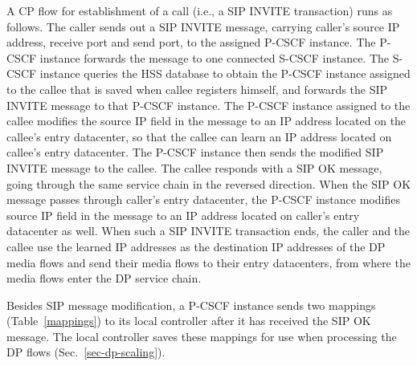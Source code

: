

A CP flow for establishment of a call (i.e., a SIP INVITE transaction) runs as follows.
The caller sends out a SIP INVITE message, carrying caller's source IP address, receive port and send port, to the assigned P-CSCF instance.
The P-CSCF instance forwards the message to one connected S-CSCF instance.  The
S-CSCF instance queries the HSS database to obtain the P-CSCF instance assigned
to the callee that is saved when callee registers himself, and forwards the SIP
INVITE message to that P-CSCF instance. The P-CSCF instance assigned to the
callee modifies the source IP field in the message to an IP address located on
the callee's entry datacenter, so that the callee can learn an IP address
located on callee's entry datacenter. The P-CSCF instance then sends the
modified SIP INVITE message to the callee.  The callee responds with a SIP OK
message, going through the same service chain in the reversed direction. When
the SIP OK message passes through caller's entry datacenter, the P-CSCF instance
modifies source IP field in the message to an IP address located on caller's
entry datacenter as well. When such a SIP INVITE transaction ends, the
caller and the callee use the learned IP addresses as the destination IP addresses of the DP media flows and send their media flows to their entry datacenters, from where the media flows enter the DP service chain.



Besides SIP message modification, a P-CSCF instance sends two mappings (Table~\ref{mappings}) to its local controller after it has received the SIP OK message. The local controller saves these mappings for use when processing the DP flows (Sec.~\ref{sec-dp-scaling}). %




